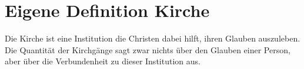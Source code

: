 \documentclass[../Religion.tex]{subfiles}
\begin{document}
	\section{Eigene Definition Kirche}
	Die Kirche ist eine Institution die Christen dabei hilft, ihren Glauben auszuleben.
	Die Quantität der Kirchgänge sagt zwar nichts über den Glauben einer Person, aber über die Verbundenheit zu dieser Institution aus.
\end{document}
